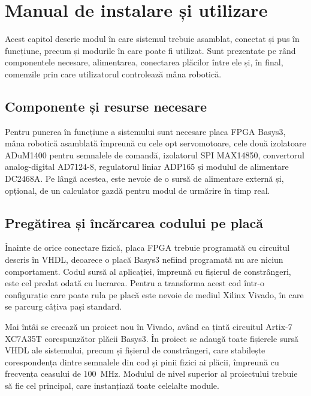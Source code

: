 \chapter{Manual de instalare și utilizare}
\label{ch:instalare}
\pagestyle{fancy}

Acest capitol descrie modul în care sistemul trebuie asamblat, conectat și pus în
funcțiune, precum și modurile în care poate fi utilizat. Sunt prezentate pe rând
componentele necesare, alimentarea, conectarea plăcilor între ele și, în final,
comenzile prin care utilizatorul controlează mâna robotică.

\section{Componente și resurse necesare}
\label{sec:manual-componente}

Pentru punerea în funcțiune a sistemului sunt necesare placa FPGA Basys3, mâna robotică
asamblată împreună cu cele opt servomotoare, cele două izolatoare ADuM1400 pentru
semnalele de comandă, izolatorul SPI MAX14850, convertorul analog-digital AD7124-8,
regulatorul liniar ADP165 și modulul de alimentare DC2468A. Pe lângă acestea, este
nevoie de o sursă de alimentare externă și, opțional, de un calculator gazdă pentru
modul de urmărire în timp real.

\section{Pregătirea și încărcarea codului pe placă}
\label{sec:manual-vivado}

Înainte de orice conectare fizică, placa FPGA trebuie programată cu circuitul descris în
VHDL, deoarece o placă Basys3 nefiind programată nu are niciun comportament. Codul sursă
al aplicației, împreună cu fișierul de constrângeri, este cel predat odată cu lucrarea.
Pentru a transforma acest cod într-o configurație care poate rula pe placă este nevoie de
mediul Xilinx Vivado, în care se parcurg câțiva pași standard.

Mai întâi se creează un proiect nou în Vivado, având ca țintă circuitul Artix-7
XC7A35T corespunzător plăcii Basys3. În proiect se adaugă toate fișierele sursă VHDL ale
sistemului, precum și fișierul de constrângeri, care stabilește corespondența dintre
semnalele din cod și pinii fizici ai plăcii, împreună cu frecvența ceasului de 100~MHz.
Modulul de nivel superior al proiectului trebuie să fie cel principal, care instanțiază
toate celelalte module.

